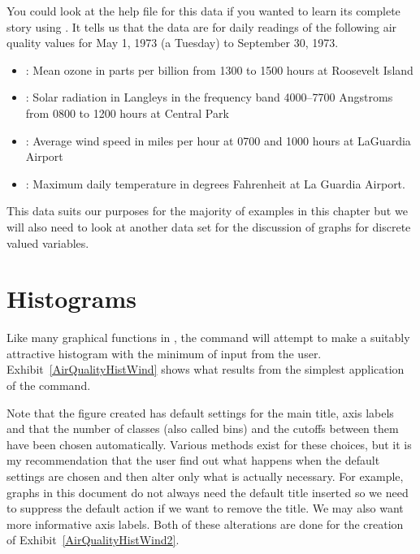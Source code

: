 You could look at the help file for this data if you wanted to learn its complete story using . It tells us that the data are for daily readings of the following air quality values for May 1, 1973 (a 
Tuesday) to September 30, 1973. 
\begin{itemize} 
\item {}: Mean ozone in parts per 
billion from 1300 to 1500 hours at Roosevelt Island 
\item {}: Solar radiation 
in Langleys in the frequency band 4000--7700 Angstroms from 
0800 to 1200 hours at Central Park 
\item {}: Average wind speed in miles 
per hour at 0700 and 1000 hours at LaGuardia Airport 
\item {}: Maximum daily 
temperature in degrees Fahrenheit at La Guardia Airport. 
\end{itemize} 
 
This data suits our purposes for the majority of examples in this chapter but we will also need to look at another data set for the discussion of graphs for discrete valued variables. 
 
\section{Histograms} 
 
Like many graphical functions in \R{}, the  command will attempt to make a suitably attractive histogram with the minimum of input from the user. Exhibit~\ref{AirQualityHistWind} shows what results from the simplest application of the  command. 
 
Note that the figure created has default settings for the main title, axis labels and that the number of classes (also called bins) and the cutoffs between them have been chosen automatically. Various methods exist for these choices, but it is my recommendation that the user find out what happens when the default settings are chosen and then alter only what is actually necessary. For example, graphs in this document do not always need the default title inserted so we need to suppress the default action if we want to remove the title. We may also want more informative axis labels. Both of these alterations are done for the creation of Exhibit~\ref{AirQualityHistWind2}.  
 
